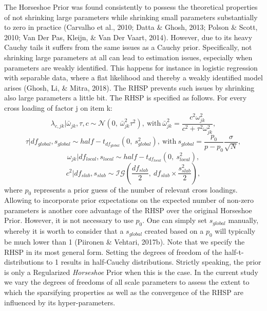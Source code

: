 \documentclass[
  man, donotrepeattitle,floatsintext]{apa6}
\begin{document}
The Horseshoe Prior was found consistently to possess the theoretical
properties of not shrinking large parameters while shrinking small
parameters substantially to zero in practice (Carvalho et al., 2010; Datta \& Ghosh, 2013; Polson \& Scott, 2010; Van Der Pas, Kleijn, \& Van Der Vaart, 2014). However, due to its
heavy Cauchy tails it suffers from the same issues as a Cauchy prior.
Specifically, not shrinking large parameters at all can lead to
estimation issues, especially when parameters are weakly identified.
This happens for instance in logistic regression with separable data,
where a flat likelihood and thereby a weakly identified model arises
(Ghosh, Li, \& Mitra, 2018). The RHSP prevents such issues by shrinking also large
parameters a little bit. The RHSP is specified as follows. For every
cross loading of factor j on item k:
\[\lambda_{c,jk} | \bar{\omega}_{jk}, \tau, c\sim \mathcal{N}(0, \ \bar{\omega}^2_{jk} \tau^2), \ \text{with} \ \bar{\omega}^2_{jk} = \frac{c^2\omega_{jk}^2}{c^2 + \tau^2 \omega_{jk}^2},\]
\[\tau | df_{global}, s_{global} \sim half-t_{df_{global}}(0,\  s_{global}^2), \ \text{with} \  s_{global} = \frac{p_0}{p-p_0}\frac{\sigma}{\sqrt{N}},\]
\[\omega_{jk}| df_{local}, s_{local} \sim half-t_{df_{local}}(0, \ s_{local}^2),\]
\[c^2 | df_{slab}, s_{slab} \sim \mathcal{IG}(\frac{df_{slab}}{2}, \  df_{slab} \times \frac{s_{slab}^2}{2}),\]
where \(p_0\) represents a prior guess of the number of relevant cross
loadings. Allowing to incorporate prior expectations on the expected
number of non-zero parameters is another core advantage of the RHSP over
the original Horseshoe Prior. However, it is not necessary to use \(p_0\).
One can simply set \(s_{global}\) manually, whereby it is worth to
consider that a \(s_{global}\) created based on a \(p_0\) will typically be
much lower than 1 (Piironen \& Vehtari, 2017b). Note that we specify the
RHSP in its most general form. Setting the degrees of freedom of the
half-t-distributions to 1 results in half-Cauchy distributions. Strictly
speaking, the prior is only a Regularized \emph{Horseshoe} Prior when this is
the case. In the current study we vary the degrees of freedoms of all
scale parameters to assess the extent to which the sparsifying
properties as well as the convergence of the RHSP are influenced by its
hyper-parameters.
\end{document}
